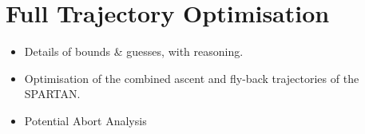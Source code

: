 
\cleardoublepage
\chapter{Full Trajectory Optimisation}\label{chapter:numerical}

\begin{itemize}
	\item Details of bounds \& guesses, with reasoning. 
	\item Optimisation of the combined ascent and fly-back trajectories of the SPARTAN.
	\item Potential Abort Analysis
\end{itemize}


